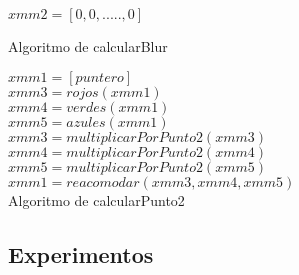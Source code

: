 ﻿\documentclass[a4paper]{article}
\begin{document}
\ \\\\
\begin{algorithm}[H]
$xmm2=[0,0,.....,0]$\\

\caption{Algoritmo de calcularBlur}
\end{algorithm}

\begin{algorithm}[H]
$xmm1=[puntero]$\\
$xmm3=rojos(xmm1)$\\
$xmm4=verdes(xmm1)$\\
$xmm5=azules(xmm1)$\\

$xmm3=multiplicarPorPunto2(xmm3)$\\
$xmm4=multiplicarPorPunto2(xmm4)$\\
$xmm5=multiplicarPorPunto2(xmm5)$\\
	
$xmm1 = reacomodar(xmm3,xmm4,xmm5)$\\	

\caption{Algoritmo de calcularPunto2}
\end{algorithm}


\subsection{Experimentos}
\end{document}
